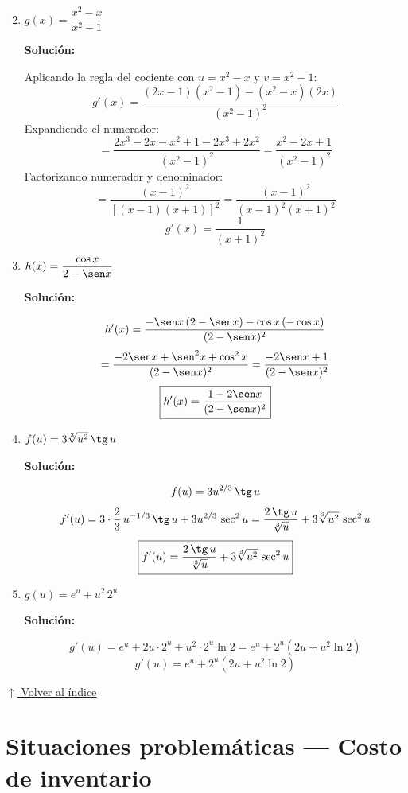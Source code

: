 \documentclass[12pt]{article}
\newcommand{\solucion}{%
    \vspace{0.8em}%
    \textbf{Solución:}%
}
\newcommand{\volverindice}{%
    \vspace{1em}%
    \begin{flushright}%
        \hyperlink{indice}{\small $\uparrow$ Volver al índice}%
    \end{flushright}%
}
\begin{document}
\begin{enumerate}[label=\alph*.-]
    \setcounter{enumi}{1} %
    \item $g(x) = \dfrac{x^2 - x}{x^2 - 1}$
 
    \solucion
 
    Aplicando la regla del cociente con $u = x^2 - x$ y $v = x^2 - 1$:
    \[
    g'(x) = \frac{(2x-1)(x^2-1) - (x^2-x)(2x)}{(x^2-1)^2}
    \]
    Expandiendo el numerador:
    \[
    = \frac{2x^3 - 2x - x^2 + 1 - 2x^3 + 2x^2}{(x^2-1)^2}
    = \frac{x^2 - 2x + 1}{(x^2-1)^2}
    \]
    Factorizando numerador y denominador:
    \[
    = \frac{(x-1)^2}{[(x-1)(x+1)]^2}
    = \frac{(x-1)^2}{(x-1)^2(x+1)^2}
    \]
    \[
    \boxed{g'(x) = \frac{1}{(x+1)^2}}
    \]

    \item $h(x) = \dfrac{\cos x}{2 - \sen x}$

    \solucion
    \[
    h'(x) = \frac{-\sen x\,(2 - \sen x) - \cos x\,(-\cos x)}{(2 - \sen x)^2}
    \]
    \[
    = \frac{-2\sen x + \sen^2 x + \cos^2 x}{(2 - \sen x)^2}
    = \frac{-2\sen x + 1}{(2-\sen x)^2}
    \]
    \[
    \boxed{h'(x) = \frac{1 - 2\sen x}{(2 - \sen x)^2}}
    \]

    \setcounter{enumi}{6} %
    \item $f(u) = 3\sqrt[3]{u^2}\,\tg\,u$

    \solucion
    \[
    f(u) = 3u^{2/3}\,\tg\,u
    \]
    \[
    f'(u) = 3 \cdot \frac{2}{3}\,u^{-1/3}\,\tg\,u + 3u^{2/3}\,\sec^2 u
    = \frac{2\,\tg\,u}{\sqrt[3]{u}} + 3\sqrt[3]{u^2}\,\sec^2 u
    \]
    \[
    \boxed{f'(u) = \frac{2\,\tg\,u}{\sqrt[3]{u}} + 3\sqrt[3]{u^2}\,\sec^2 u}
    \]

    \item $g(u) = e^u + u^2\,2^u$

    \solucion
    \[
    g'(u) = e^u + 2u \cdot 2^u + u^2 \cdot 2^u \ln 2
    = e^u + 2^u(2u + u^2 \ln 2)
    \]
    \[
    \boxed{g'(u) = e^u + 2^u\!\left(2u + u^2\ln 2\right)}
    \]
\end{enumerate}

\volverindice
\newpage

\section{Situaciones problemáticas — Costo de inventario}
\end{document}

